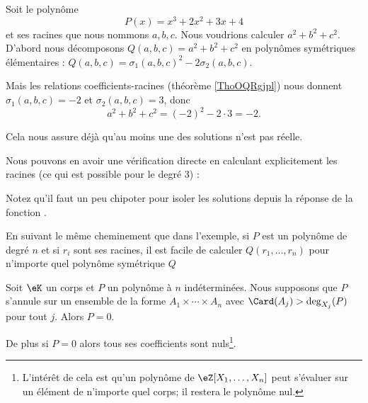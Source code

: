 
\begin{example} \label{ExHIfHhBr}
    Soit le polynôme
    \begin{equation}
        P(x)=x^3+2x^2+3x+4
    \end{equation}
    et ses racines que nous nommons \( a,b,c\). Nous voudrions calculer \( a^2+b^2+c^2\). D'abord nous décomposons \( Q(a,b,c)=a^2+b^2+c^2\) en polynômes symétriques élémentaires : \( Q(a,b,c)=\sigma_1(a,b,c)^2-2\sigma_2(a,b,c)\).

    Mais les relations coefficients-racines (théorème \ref{ThoOQRgjpl}) nous donnent \( \sigma_1(a,b,c)=-2\) et \( \sigma_2(a,b,c)=3\), donc
    \begin{equation}
        a^2+b^2+c^2=(-2)^2-2\cdot 3=-2.
    \end{equation}

    Cela nous assure déjà qu'au moins une des solutions n'est pas réelle.

    Nous pouvons en avoir une vérification directe en calculant explicitement les racines (ce qui est possible pour le degré \( 3\)) :
    

    Notez qu'il faut un peu chipoter pour isoler les solutions depuis la réponse de la fonction .
\end{example}

En suivant le même cheminement que dans l'exemple, si \( P\) est un polynôme de degré \( n\) et si \( r_i\) sont ses racines, il est facile de calculer \( Q(r_1,\ldots, r_n)\) pour n'importe quel polynôme symétrique \( Q\)

\begin{proposition} \label{PropTETooGuBYQf}
    Soit \( \eK\) un corps et \( P\) un polynôme à \( n\) indéterminées. Nous supposons que \(P\) s'annule sur un ensemble de la forme \( A_1\times\cdots\times A_n\) avec \( \Card(A_j)>\deg_{X_j}(P)\) pour tout \( j\). Alors \( P=0\).

    De plus si \( P=0\) alors tous ses coefficients sont nuls\footnote{L'intérêt de cela est qu'un polynôme de \( \eZ[X_1,\ldots, X_n]\) peut s'évaluer sur un élément de n'importe quel corps; il restera le polynôme nul.}.
\end{proposition}

